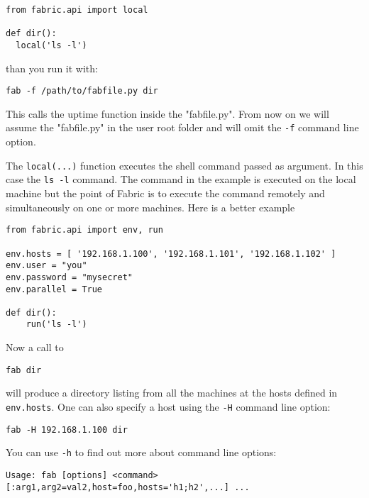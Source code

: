 \documentclass[justified,sixbynine]{tufte-book}
\def\ft{\small\tt}
\theoremstyle{plain}%
\theoremstyle{definition}
\theoremstyle{remark}
\begin{document}
\begin{fullwidth}
\begin{lstlisting}
from fabric.api import local

def dir():
  local('ls -l')
\end{lstlisting}

than you run it with:

\begin{lstlisting}
fab -f /path/to/fabfile.py dir
\end{lstlisting}

This calls the uptime function inside the "fabfile.py". From now on we will assume the "fabfile.py" in the user root folder and will omit the {\ft -f} command line option.

The {\ft local(...)} function executes the shell command passed as argument. In this case the {\ft ls -l} command. The command in the example is executed on the local machine but the point of Fabric is to execute the command remotely and simultaneously on one or more machines. Here is a better example

\begin{lstlisting}
from fabric.api import env, run

env.hosts = [ '192.168.1.100', '192.168.1.101', '192.168.1.102' ]
env.user = "you"
env.password = "mysecret"
env.parallel = True

def dir():
    run('ls -l')
\end{lstlisting}

Now a call to
\begin{lstlisting}
fab dir
\end{lstlisting}

will produce a directory listing from all the machines at the hosts defined in {\ft env.hosts}.  One can also specify a host using the {\ft -H} command line option:

\begin{lstlisting}
fab -H 192.168.1.100 dir
\end{lstlisting}

You can use {\ft -h} to find out more about command line options:

\begin{lstlisting}
Usage: fab [options] <command>[:arg1,arg2=val2,host=foo,hosts='h1;h2',...] ...


\end{lstlisting}
\end{fullwidth}
\end{document}

